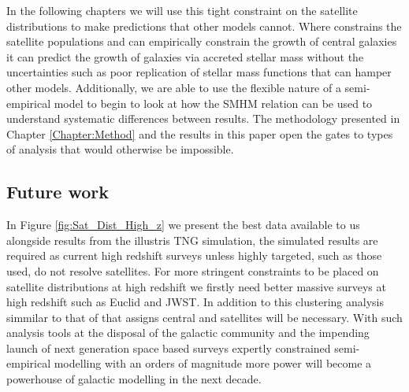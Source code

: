  In the following chapters we will use this tight constraint on the satellite distributions to make predictions that other models cannot. Where \steel constrains the satellite populations and can empirically constrain the growth of central galaxies it can predict the growth of galaxies via accreted stellar mass without the uncertainties such as poor replication of stellar mass functions that can hamper other models. Additionally, we are able to use the flexible nature of a semi-empirical model to begin to look at how the SMHM relation can be used to understand systematic differences between results. The methodology presented in Chapter \ref{Chapter:Method} and the results in this paper open the gates to types of analysis that would otherwise be impossible.
 
 \subsection{Future work}
 In Figure \ref{fig:Sat_Dist_High_z} we present the best data available to us alongside results from the illustris TNG simulation, the simulated results are required as current high redshift surveys unless highly targeted, such as those used, do not resolve satellites. For more stringent constraints to be placed on satellite distributions at high redshift we firstly need better massive surveys at high redshift such as Euclid and JWST. In addition to this clustering analysis simmilar to that of \citet{Yang2012EVOLUTIONHALOS} that assigns central and satellites will be necessary. With such analysis tools at the disposal of the galactic community and the impending launch of next generation space based surveys expertly constrained semi-empirical modelling with an orders of magnitude more power will become a powerhouse of galactic modelling in the next decade. 